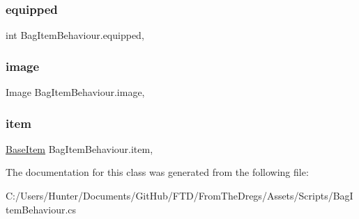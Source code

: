 \subsubsection{\texorpdfstring{equipped}{equipped}}
{\footnotesize\ttfamily int Bag\+Item\+Behaviour.\+equipped\hspace{0.3cm}{\ttfamily [get]}, {\ttfamily [set]}}

\mbox{\label{class_bag_item_behaviour_a10d2d4e2b468574fb4f922da7f300cbc}} 
\subsubsection{\texorpdfstring{image}{image}}
{\footnotesize\ttfamily Image Bag\+Item\+Behaviour.\+image\hspace{0.3cm}{\ttfamily [get]}, {\ttfamily [set]}}

\mbox{\label{class_bag_item_behaviour_aae12bd30d28c11b793bd8db232e9c2a2}} 
\subsubsection{\texorpdfstring{item}{item}}
{\footnotesize\ttfamily \mbox{\hyperlink{class_base_item}{Base\+Item}} Bag\+Item\+Behaviour.\+item\hspace{0.3cm}{\ttfamily [get]}, {\ttfamily [set]}}



The documentation for this class was generated from the following file\+:\begin{DoxyCompactItemize}
\item 
C\+:/\+Users/\+Hunter/\+Documents/\+Git\+Hub/\+F\+T\+D/\+From\+The\+Dregs/\+Assets/\+Scripts/Bag\+Item\+Behaviour.\+cs\end{DoxyCompactItemize}
